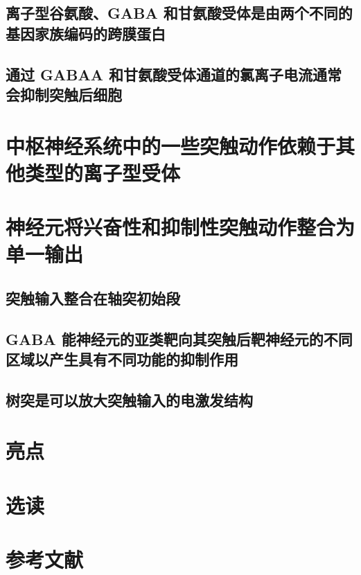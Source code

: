 \subsection{离子型谷氨酸、GABA 和甘氨酸受体是由两个不同的基因家族编码的跨膜蛋白}
\subsection{通过 GABAA 和甘氨酸受体通道的氯离子电流通常会抑制突触后细胞}

\section{中枢神经系统中的一些突触动作依赖于其他类型的离子型受体}

\section{神经元将兴奋性和抑制性突触动作整合为单一输出}
\subsection{突触输入整合在轴突初始段}
\subsection{GABA 能神经元的亚类靶向其突触后靶神经元的不同区域以产生具有不同功能的抑制作用}
\subsection{树突是可以放大突触输入的电激发结构}


\section{亮点}

\section{选读}

\section{参考文献}




